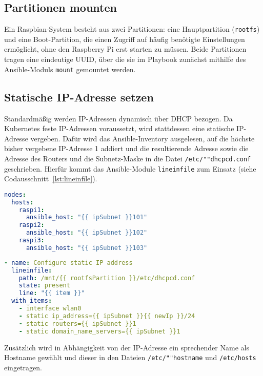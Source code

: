 \subsection{Partitionen mounten}\label{subsec:partitionen-mounten}

Ein Raspbian-System besteht aus zwei Partitionen: eine Hauptpartition (\texttt{rootfs}) und eine Boot-Partition, die einen Zugriff auf häufig benötigte Einstellungen ermöglicht, ohne den Raspberry Pi erst starten zu müssen.
Beide Partitionen tragen eine eindeutige UUID, über die sie im Playbook zunächst mithilfe des Ansible-Moduls \texttt{mount} gemountet werden.

\subsection{Statische IP-Adresse setzen}\label{subsec:statische-ip-adresse-setzen}

Standardmäßig werden IP-Adressen dynamisch über DHCP bezogen.
Da Kubernetes feste IP-Adressen voraussetzt, wird stattdessen eine statische IP-Adresse vergeben.
Dafür wird das Ansible-Inventory ausgelesen, auf die höchste bisher vergebene IP-Adresse 1 addiert und die resultierende Adresse sowie die Adresse des Routers und die Subnetz-Maske in die Datei \texttt{/etc/""dhcpcd.conf} geschrieben.
Hierfür kommt das Ansible-Module \texttt{lineinfile} zum Einsatz (siehe Codausschnitt~\ref{lst:lineinfile}).

\begin{lstlisting}[language=yaml, caption=Ansible-Inventory mit drei Hosts]
nodes:
  hosts:
    raspi1:
      ansible_host: "{{ ipSubnet }}101"
    raspi2:
      ansible_host: "{{ ipSubnet }}102"
    raspi3:
      ansible_host: "{{ ipSubnet }}103"
\end{lstlisting}

\begin{lstlisting}[language=yaml, caption=Ansible-Task zur Einrichtung einer statischen IP-Adresse,label={lst:lineinfile}]
- name: Configure static IP address
  lineinfile:
    path: /mnt/{{ rootfsPartition }}/etc/dhcpcd.conf
    state: present
    line: "{{ item }}"
  with_items:
    - interface wlan0
    - static ip_address={{ ipSubnet }}{{ newIp }}/24
    - static routers={{ ipSubnet }}1
    - static domain_name_servers={{ ipSubnet }}1
\end{lstlisting}

Zusätzlich wird in Abhängigkeit von der IP-Adresse ein sprechender Name als Hostname gewählt und dieser in den Dateien \texttt{/etc/""hostname} und \texttt{/etc/hosts} eingetragen.

